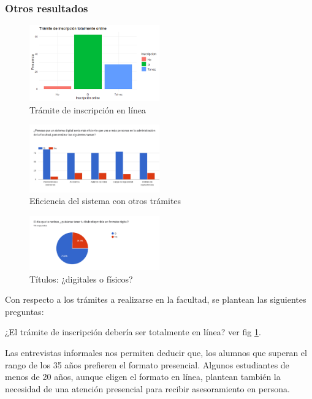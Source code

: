 \documentclass[a4paper]{article}
\begin{document}
\subsubsection{Otros resultados}
\begin{figure}
\centering
\includegraphics[width=0.5\textwidth]{Imagen5.png}
\caption{\label{fig:Imagen5}Trámite de inscripción en línea}
\end{figure}
\begin{figure}
\centering
\includegraphics[width=0.5\textwidth]{Imagen6.png}
\caption{\label{fig:Imagen6}Eficiencia del sistema con otros trámites}
\end{figure}
\begin{figure}
\centering
\includegraphics[width=0.5\textwidth]{Imagen7.png}
\caption{\label{fig:Imagen7}Títulos: ¿digitales o físicos?}
\end{figure}
Con respecto a los trámites a realizarse en la facultad, se plantean las siguientes preguntas:

¿El trámite de inscripción debería ser totalmente en línea? ver fig \ref{fig:Imagen5}. 

Las entrevistas informales nos permiten deducir que, los alumnos que superan el rango de los 35 años prefieren el formato presencial. Algunos estudiantes de menos de 20 años, aunque eligen el formato en línea, plantean también la necesidad de una atención presencial para recibir asesoramiento en persona. 
\end{document}
